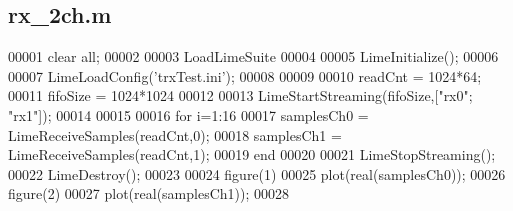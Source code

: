 \subsection{rx\+\_\+2ch.\+m}
\label{rx__2ch_8m_source}

\begin{DoxyCode}
00001 clear all;
00002 
00003 LoadLimeSuite
00004 
00005 LimeInitialize();               %
00006 
00007 LimeLoadConfig(\textcolor{stringliteral}{'trxTest.ini'});  %
00008                                 %
00009 
00010 readCnt = 1024*64;          %
00011 fifoSize = 1024*1024        %
00012 
00013 LimeStartStreaming(fifoSize,["rx0"; "rx1"]); %
00014 
00015 %
00016 for i=1:16
00017     samplesCh0 = LimeReceiveSamples(readCnt,0); %
00018     samplesCh1 = LimeReceiveSamples(readCnt,1); %
00019 end
00020 %
00021 LimeStopStreaming();      %
00022 LimeDestroy();            %
00023 %
00024 figure(1)
00025 plot(real(samplesCh0));
00026 figure(2)
00027 plot(real(samplesCh1));
00028 
\end{DoxyCode}
